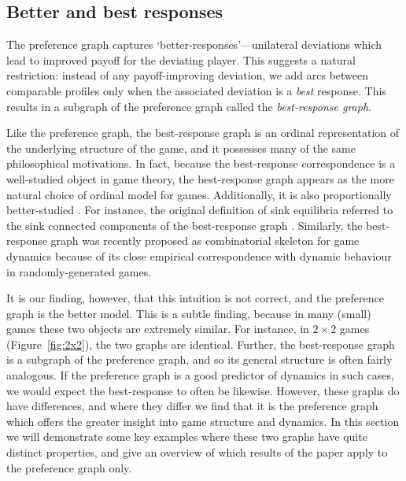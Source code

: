 \documentclass[preprint,authoryear]{elsarticle}
\begin{document}
\subsection{Better and best responses} \label{sec: better and best}

The preference graph captures `better-responses'---unilateral deviations which lead to improved payoff for the deviating player. This suggests a natural restriction: instead of any payoff-improving deviation, we add arcs between comparable profiles only when the associated deviation is a \emph{best} response. This results in a subgraph of the preference graph called the \emph{best-response graph}.

Like the preference graph, the best-response graph is an ordinal representation of the underlying structure of the game, and it possesses many of the same philosophical motivations. In fact, because the best-response correspondence is a well-studied object in game theory, the best-response graph appears as the more natural choice of ordinal model for games. Additionally, it is also proportionally better-studied \citep{mirrokni_convergence_2004,goemans_sink_2005,christodoulou_convergence_2006}. For instance, the original definition of sink equilibria referred to the sink connected components of the best-response graph \citep{goemans_sink_2005}. Similarly, the best-response graph was recently proposed as combinatorial skeleton for game dynamics \citep{pangallo_best_2019} because of its close empirical correspondence with dynamic behaviour in randomly-generated games.

It is our finding, however, that this intuition is not correct, and the preference graph is the better model. This is a subtle finding, because in many (small) games these two objects are extremely similar. For instance, in $2\times 2$ games (Figure~\ref{fig:2x2}), the two graphs are identical. Further, the best-response graph is a subgraph of the preference graph, and so its general structure is often fairly analogous. If the preference graph is a good predictor of dynamics in such cases, we would expect the best-response to often be likewise. However, these graphs do have differences, and where they differ we find that it is the preference graph which offers the greater insight into game structure and dynamics. In this section we will demonstrate some key examples where these two graphs have quite distinct properties, and give an overview of which results of the paper apply to the preference graph only.
\end{document}
